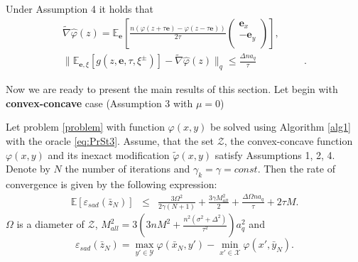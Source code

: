 \documentclass[runningheads]{llncs}
\begin{document}
\begin{lemma}\label{lemmasham}
    Under Assumption 4 it holds that 
    \begin{eqnarray}
    \label{temp985}
    \tilde \nabla \hat{\varphi}(z) = \mathbb{E}_{\mathbf{e}}\left[\frac{n\left(\varphi(z + \tau \mathbf{e}) -  \varphi(z - \tau \mathbf{e})\right)}{2\tau}\left(
    \begin{array}{c}
    \mathbf{e}_x\\
    -\mathbf{e}_y \\
    \end{array}\right)\right],\\
    \|\mathbb{E}_{\mathbf{e},\xi}[ g(z, \mathbf{e}, \tau, \xi^{\pm}) ] - \tilde \nabla \hat{\varphi}(z)\|_q \leq \frac{\Delta n a_q}{\tau}\label{temp986}\hspace{2cm}.
    \end{eqnarray}
\end{lemma}

Now we are ready to present the main results of this section. Let begin with \textbf{convex-concave} case (Assumption 3 with $\mu=0$)
\begin{theorem} \label{th_main}
Let problem \eqref{problem} with function $\varphi(x,y)$ be solved using Algorithm \ref{alg1} with the oracle \eqref{eq:PrSt3}. Assume, that the set $\mathcal{Z}$, the convex-concave function  $\varphi(x,y)$ and its inexact modification $\widetilde{\varphi}(x,y)$ satisfy Assumptions 1, 2, 4. Denote by $N$ the number of iterations and $\gamma_k = \gamma =const$. Then the rate of convergence is given by the following expression:
\begin{eqnarray*}
    \mathbb{E}\left[\varepsilon_{sad}(\bar z_{N})\right] &\leq&
    \frac{3\Omega^2}{2 \gamma (N+1)} + \frac{3\gamma M^2_{all}}{2} + \frac{\Delta \Omega n a_q}{\tau} + 2\tau M.
\end{eqnarray*} 
$\Omega$ is a diameter of $\mathcal{Z}$, $M^2_{all} = 3\left(3n M^2 +\frac{n^2(\sigma^2 + \Delta^2)}{\tau^2}\right)a^2_q$ and 
\begin{equation}
    \label{sad}
    \varepsilon_{sad}(\bar z_{N}) = \max_{y' \in \mathcal{Y}} \varphi(\bar x_{N}, y') - \min_{x' \in \mathcal{X}} \varphi(x', \bar y_{N}).
\end{equation}
\end{theorem}
\end{document}
